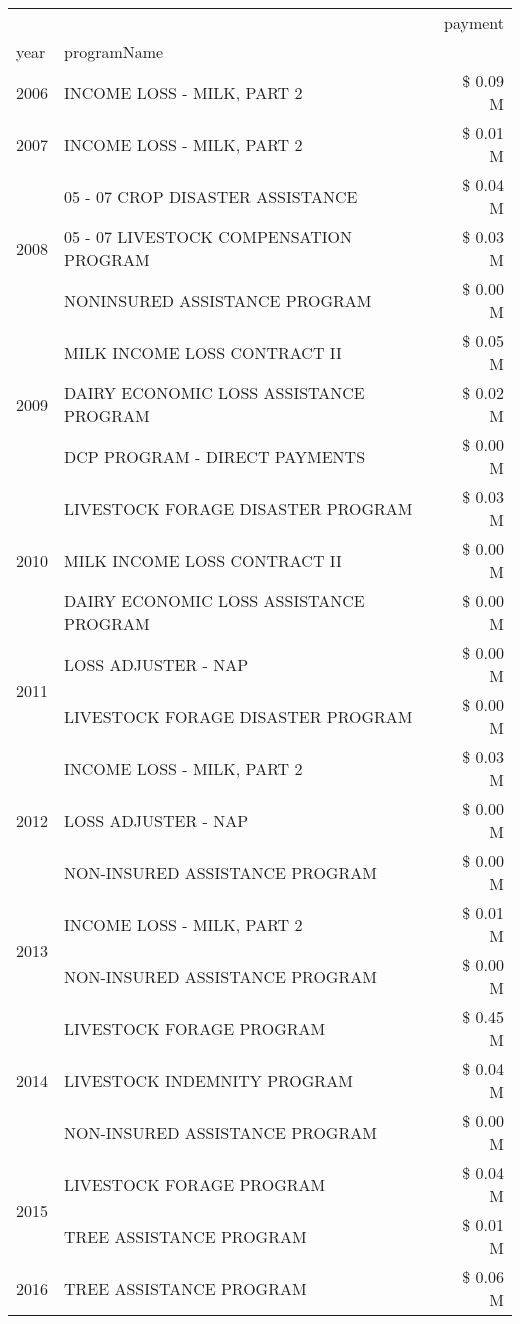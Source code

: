 \begin{tabular}{llr}
\toprule
 &  & payment \\
year & programName &  \\
\midrule
2006 & INCOME LOSS - MILK, PART 2 & \$ 0.09 M \\
\cline{1-3}
2007 & INCOME LOSS - MILK, PART 2 & \$ 0.01 M \\
\cline{1-3}
\multirow[t]{3}{*}{2008} & 05 - 07 CROP DISASTER ASSISTANCE & \$ 0.04 M \\
 & 05 - 07 LIVESTOCK COMPENSATION PROGRAM & \$ 0.03 M \\
 & NONINSURED ASSISTANCE PROGRAM & \$ 0.00 M \\
\cline{1-3}
\multirow[t]{3}{*}{2009} & MILK INCOME LOSS CONTRACT II & \$ 0.05 M \\
 & DAIRY ECONOMIC LOSS ASSISTANCE PROGRAM & \$ 0.02 M \\
 & DCP PROGRAM - DIRECT PAYMENTS & \$ 0.00 M \\
\cline{1-3}
\multirow[t]{3}{*}{2010} & LIVESTOCK FORAGE DISASTER  PROGRAM & \$ 0.03 M \\
 & MILK INCOME LOSS CONTRACT II & \$ 0.00 M \\
 & DAIRY ECONOMIC LOSS ASSISTANCE PROGRAM & \$ 0.00 M \\
\cline{1-3}
\multirow[t]{2}{*}{2011} & LOSS ADJUSTER - NAP & \$ 0.00 M \\
 & LIVESTOCK FORAGE DISASTER PROGRAM & \$ 0.00 M \\
\cline{1-3}
\multirow[t]{3}{*}{2012} & INCOME LOSS - MILK, PART 2 & \$ 0.03 M \\
 & LOSS ADJUSTER - NAP & \$ 0.00 M \\
 & NON-INSURED ASSISTANCE PROGRAM & \$ 0.00 M \\
\cline{1-3}
\multirow[t]{2}{*}{2013} & INCOME LOSS - MILK, PART 2 & \$ 0.01 M \\
 & NON-INSURED ASSISTANCE PROGRAM & \$ 0.00 M \\
\cline{1-3}
\multirow[t]{3}{*}{2014} & LIVESTOCK FORAGE PROGRAM & \$ 0.45 M \\
 & LIVESTOCK INDEMNITY PROGRAM & \$ 0.04 M \\
 & NON-INSURED ASSISTANCE PROGRAM & \$ 0.00 M \\
\cline{1-3}
\multirow[t]{2}{*}{2015} & LIVESTOCK FORAGE PROGRAM & \$ 0.04 M \\
 & TREE ASSISTANCE PROGRAM & \$ 0.01 M \\
\cline{1-3}
2016 & TREE ASSISTANCE PROGRAM                       & \$ 0.06 M \\

\end{tabular}
